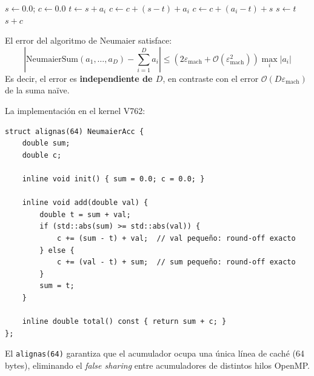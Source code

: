\begin{algorithm}
\caption{Neumaier Compensated Summation (Mejora de Kahan)}
\label{alg:neumaier}
\begin{algorithmic}[1]
  \State $s \gets 0.0$; $c \gets 0.0$ 
    \State $t \gets s + a_i$
      \State $c \gets c + (s - t) + a_i$ 
    \Else
      \State $c \gets c + (a_i - t) + s$ 
    \EndIf
    \State $s \gets t$
  \EndFor
  \State \Return $s + c$
\EndProcedure
\end{algorithmic}
\end{algorithm}

\begin{theorem}
\label{thm:neumaier}
El error del algoritmo de Neumaier satisface:
\begin{equation}
\left|\text{NeumaierSum}(a_1, \ldots, a_D) - \sum_{i=1}^D a_i\right| \le (2\varepsilon_{\text{mach}} + \mathcal{O}(\varepsilon_{\text{mach}}^2)) \max_i |a_i|
\end{equation}
Es decir, el error es \textbf{independiente de $D$}, en contraste con el error $\mathcal{O}(D\varepsilon_{\text{mach}})$ de la suma naïve.
\end{theorem}

La implementación en el kernel V762:

\begin{lstlisting}[style=cppstyle, caption={Acumulador de Neumaier (kernel\_cpp\_v762.cpp)}, label=lst:neumaier_cpp]
struct alignas(64) NeumaierAcc {
    double sum;
    double c;

    inline void init() { sum = 0.0; c = 0.0; }

    inline void add(double val) {
        double t = sum + val;
        if (std::abs(sum) >= std::abs(val)) {
            c += (sum - t) + val;  // val pequeño: round-off exacto
        } else {
            c += (val - t) + sum;  // sum pequeño: round-off exacto
        }
        sum = t;
    }

    inline double total() const { return sum + c; }
};
\end{lstlisting}

El \texttt{alignas(64)} garantiza que el acumulador ocupa una única línea de caché
(64 bytes), eliminando el \textit{false sharing} entre acumuladores de distintos hilos OpenMP.

